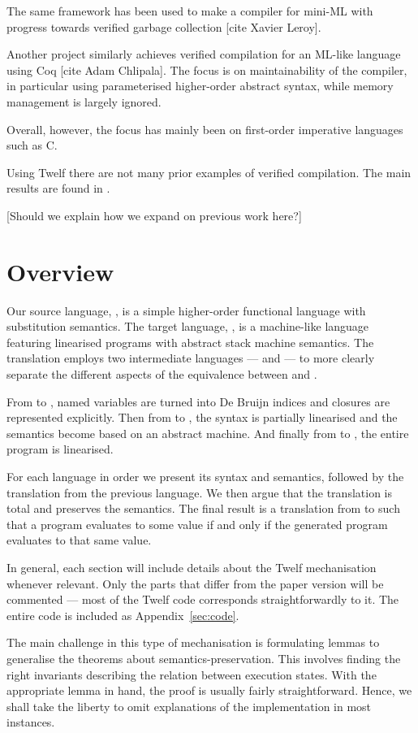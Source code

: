 The same framework has been used to make a compiler for mini-ML with progress towards verified garbage collection [cite Xavier Leroy].

Another project similarly achieves verified compilation for an ML-like language using Coq [cite Adam Chlipala].
The focus is on maintainability of the compiler, in particular using parameterised higher-order abstract syntax, while memory management is largely ignored.

Overall, however, the focus has mainly been on first-order imperative languages such as C.

Using Twelf there are not many prior examples of verified compilation.
The main results are found in \cite[ch. 6]{Pfenning01}.

[Should we explain how we expand on previous work here?]


\section{Overview}

Our source language, \hlang, is a simple higher-order functional language with substitution semantics.
The target language, \mlang, is a machine-like language featuring linearised programs with abstract stack machine semantics.
The translation employs two intermediate languages --- \blang and \slang --- to more clearly separate the different aspects of the equivalence between \hlang and \mlang.

From \hlang to \blang, named variables are turned into De Bruijn indices and closures are represented explicitly.
Then from \blang to \slang, the syntax is partially linearised and the semantics become based on an abstract machine.
And finally from \slang to \mlang, the entire program is linearised.

For each language in order we present its syntax and semantics, followed by the translation from the previous language.
We then argue that the translation is total and preserves the semantics.
The final result is a translation from \hlang to \mlang such that a \hlang program evaluates to some value if and only if the generated \mlang program evaluates to that same value.

In general, each section will include details about the Twelf mechanisation whenever relevant.
Only the parts that differ from the paper version will be commented --- most of the Twelf code corresponds straightforwardly to it.
The entire code is included as Appendix~\ref{sec:code}.

The main challenge in this type of mechanisation is formulating lemmas to generalise the theorems about semantics-preservation.
This involves finding the right invariants describing the relation between execution states.
With the appropriate lemma in hand, the proof is usually fairly straightforward.
Hence, we shall take the liberty to omit explanations of the implementation in most instances.
